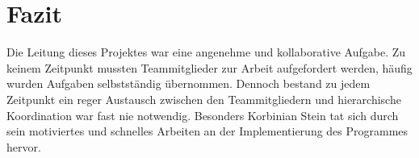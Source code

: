 \documentclass{article}
\begin{document}
\section{Fazit}

Die Leitung dieses Projektes war eine angenehme und kollaborative Aufgabe.
Zu keinem Zeitpunkt mussten Teammitglieder zur Arbeit aufgefordert werden,
häufig wurden Aufgaben selbstständig übernommen. Dennoch bestand zu jedem
Zeitpunkt ein reger Austausch zwischen den Teammitgliedern und hierarchische
Koordination war fast nie notwendig. Besonders Korbinian Stein tat sich durch
sein motiviertes und schnelles Arbeiten an der Implementierung des Programmes
hervor.
\end{document}
